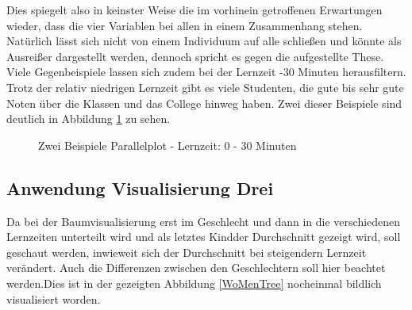 \documentclass[usegeometry=true]{scrartcl}
\begin{document}
\noindent Dies spiegelt also in keinster Weise die im vorhinein getroffenen Erwartungen wieder, dass die vier Variablen bei allen in einem Zusammenhang stehen.\\
Natürlich lässt sich nicht von einem Individuum auf alle schließen und könnte als Ausreißer dargestellt werden, dennoch spricht es gegen die aufgestellte These.\\

\noindent Viele Gegenbeispiele lassen sich zudem bei der Lernzeit -30 Minuten herausfiltern\grqq . Trotz der relativ niedrigen Lernzeit gibt es viele Studenten, die gute bis sehr gute Noten über die Klassen und das College hinweg haben. Zwei dieser Beispiele sind deutlich in Abbildung \ref{BspPar} zu sehen.


\begin{figure}
\begin{center}
\caption{Zwei Beispiele Parallelplot - Lernzeit: 0 - 30 Minuten}
\label{BspPar}
\end{center}
\end{figure}



\subsection{Anwendung Visualisierung Drei}
\label{AnwDrei}

Da bei der Baumvisualisierung erst im Geschlecht und dann in die verschiedenen Lernzeiten unterteilt wird und als letztes \glqq Kind\grqq der Durchschnitt gezeigt wird, soll geschaut werden, inwieweit sich der Durchschnitt bei steigendern Lernzeit verändert. Auch die Differenzen zwischen den Geschlechtern soll hier beachtet werden.Dies ist in der gezeigten Abbildung \ref{WoMenTree} nocheinmal bildlich visualisiert worden.
\end{document}
